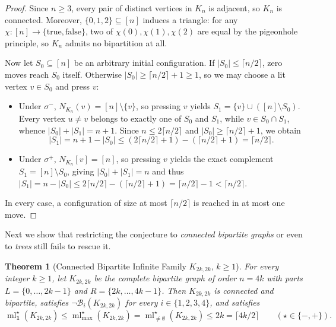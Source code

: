 \documentclass[11pt,a4paper]{article}
\newtheorem{theorem}{Theorem}[section]
\theoremstyle{definition}
\newcommand{\ml}{\operatorname{ml}}
\newcommand{\ceilhalf}[1]{\lceil #1 / 2 \rceil}
\begin{document}
\begin{proof}
Since $n \ge 3$, every pair of distinct vertices in $K_n$ is adjacent, so $K_n$ is
connected. Moreover, $\{0, 1, 2\} \subseteq [n]$ induces a triangle: for any
$\chi : [n] \to \{\mathrm{true}, \mathrm{false}\}$, two of $\chi(0), \chi(1), \chi(2)$
are equal by the pigeonhole principle, so $K_n$ admits no bipartition at all.

Now let $S_0 \subseteq [n]$ be an arbitrary initial configuration. If
$|S_0| \le \ceilhalf{n}$, zero moves reach $S_0$ itself. Otherwise
$|S_0| \ge \ceilhalf{n} + 1 \ge 1$, so we may choose a lit vertex $v \in S_0$ and
press $v$:
\begin{itemize}
\item Under $\sigma^-$, $N_{K_n}(v) = [n] \setminus \{v\}$, so pressing $v$ yields
$S_1 = \{v\} \cup ([n] \setminus S_0)$. Every vertex $u \neq v$ belongs to exactly
one of $S_0$ and $S_1$, while $v \in S_0 \cap S_1$, whence
$|S_0| + |S_1| = n + 1$. Since $n \le 2\ceilhalf{n}$ and $|S_0| \ge \ceilhalf{n} + 1$,
we obtain
\[
|S_1| = n + 1 - |S_0| \le (2\ceilhalf{n} + 1) - (\ceilhalf{n} + 1) = \ceilhalf{n}.
\]
\item Under $\sigma^+$, $N_{K_n}[v] = [n]$, so pressing $v$ yields the exact
complement $S_1 = [n] \setminus S_0$, giving $|S_0| + |S_1| = n$ and thus
$|S_1| = n - |S_0| \le 2\ceilhalf{n} - (\ceilhalf{n} + 1) = \ceilhalf{n} - 1 < \ceilhalf{n}$.
\end{itemize}
In every case, a configuration of size at most $\ceilhalf{n}$ is reached in at most one move.
\end{proof}

Next we show that restricting the conjecture to \emph{connected bipartite graphs}
or even to \emph{trees} still fails to rescue it.

\begin{theorem}[Connected Bipartite Infinite Family $K_{2k,2k}$, $k \ge 1$]
\label{thm:k2k}
For every integer $k \ge 1$, let $K_{2k,2k}$ be the complete bipartite graph of
order $n = 4k$ with parts $L = \{0, \dots, 2k-1\}$ and $R = \{2k, \dots, 4k-1\}$.
Then $K_{2k,2k}$ is connected and bipartite, satisfies $\neg \mathcal{B}_i(K_{2k,2k})$
for every $i \in \{1, 2, 3, 4\}$, and satisfies
\[
\ml_{\mathbf{1}}^\star(K_{2k,2k}) \le \ml_{\max}^\star(K_{2k,2k})
= \ml_{\neq\emptyset}^\star(K_{2k,2k}) \le 2k = \ceilhalf{4k}
\qquad (\star \in \{-, +\}).
\]
\end{theorem}
\end{document}
